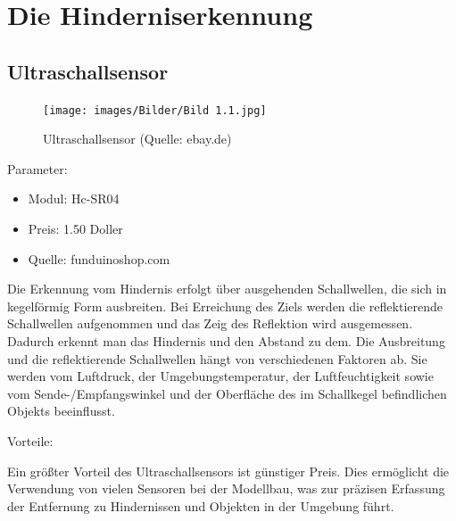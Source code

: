 \renewcommand{\autoren}{Valentyn Chepil}
\newpage
\section{Die Hinderniserkennung}
\subsection{Ultraschallsensor}

\begin{figure}[h]  %
	\centering\texttt{[image: images/Bilder/Bild 1.1.jpg]}
	\caption{Ultraschallsensor \newline(Quelle: ebay.de)}
	\label{bild_1.1} %
\end{figure}

Parameter:
\begin{itemize} 
	\item Modul: Hc-SR04 
	\item Preis:  1.50 Doller
	\item Quelle: funduinoshop.com
\end{itemize}

Die Erkennung vom Hindernis erfolgt über ausgehenden Schallwellen, die sich in kegelförmig Form  ausbreiten. Bei Erreichung des Ziels werden die reflektierende Schallwellen aufgenommen und das Zeig des Reflektion wird ausgemessen. Dadurch erkennt man das Hindernis und den Abstand zu dem. Die Ausbreitung und die reflektierende Schallwellen hängt von verschiedenen Faktoren ab. Sie werden vom Luftdruck, der Umgebungstemperatur, der Luftfeuchtigkeit sowie
vom Sende-/Empfangswinkel und der Oberfläche des im Schallkegel befindlichen Objekts
beeinflusst.

  Vorteile:

Ein größter Vorteil des Ultraschallsensors ist günstiger Preis. Dies ermöglicht die Verwendung von vielen Sensoren bei der Modellbau, was zur präzisen Erfassung der Entfernung zu Hindernissen und Objekten in der Umgebung führt.


